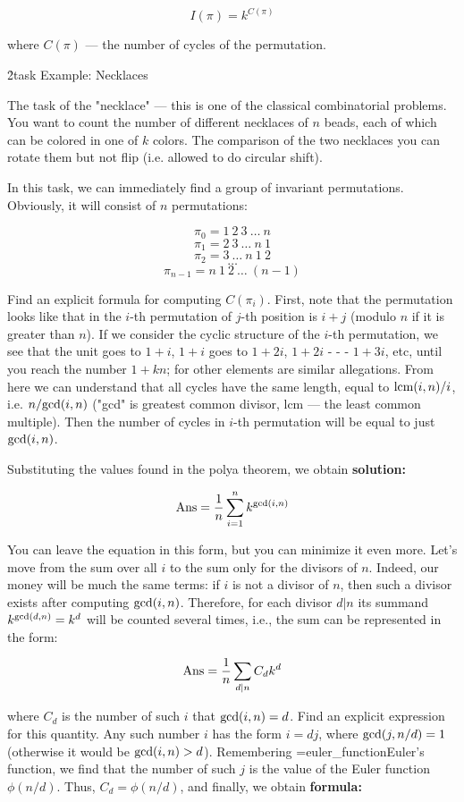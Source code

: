$$ I(\pi) = k ^ {C(\pi)} $$

where $C(\pi)$ --- the number of cycles of the permutation.

\h2{task Example: Necklaces}

The task of the "necklace" --- this is one of the classical combinatorial problems. You want to count the number of different necklaces of $n$ beads, each of which can be colored in one of $k$ colors. The comparison of the two necklaces you can rotate them but not flip (i.e. allowed to do circular shift).

In this task, we can immediately find a group of invariant permutations. Obviously, it will consist of $n$ permutations:

$$ \pi_0 = 1\ 2\ 3\ \ldots\ n $$
$$ \pi_1 = 2\ 3\ \ldots\ n\ 1 $$
$$ \pi_2 = 3\ \ldots\ n\ 1\ 2 $$
$$ \ldots $$
$$ \pi_{n-1} = n\ 1\ 2\ \ldots\ (n-1) $$

Find an explicit formula for computing $C(\pi_i)$. First, note that the permutation looks like that in the $i$-th permutation of $j$-th position is $i+j$ (modulo $n$ if it is greater than $n$). If we consider the cyclic structure of the $i$-th permutation, we see that the unit goes to $1+i$, $1+i$ goes to $1+2i$, $1+2i$ - - - $1+3i$, etc, until you reach the number $1 + kn$; for other elements are similar allegations. From here we can understand that all cycles have the same length, equal to ${\rm lcm}(i,n) / i$, i.e. $n / {\rm gcd}(i,n)$ ("gcd" is greatest common divisor, lcm --- the least common multiple). Then the number of cycles in $i$-th permutation will be equal to just ${\rm gcd}(i,n)$.

Substituting the values found in the polya theorem, we obtain \bf{solution}:

$$ {\rm Ans} = \frac{1}{n} \sum_{i=1}^{n} k ^ {{\rm gcd}(i,n)} $$

You can leave the equation in this form, but you can minimize it even more. Let's move from the sum over all $i$ to the sum only for the divisors of $n$. Indeed, our money will be much the same terms: if $i$ is not a divisor of $n$, then such a divisor exists after computing ${\rm gcd}(i,n)$. Therefore, for each divisor $d|n$ its summand $k^{{\rm gcd}(d,n)} = k^d$ will be counted several times, i.e., the sum can be represented in the form:

$$ {\rm Ans} = \frac{1}{n} \sum_{d|n} C_d k^d $$

where $C_d$ is the number of such $i$ that ${\rm gcd}(i,n) = d$. Find an explicit expression for this quantity. Any such number $i$ has the form $i=dj$, where ${\rm gcd}(j,n/d) = 1$ (otherwise it would be ${\rm gcd}(i,n) > d$). Remembering \algohref=euler_function{Euler's function}, we find that the number of such $j$ is the value of the Euler function $\phi(n/d)$. Thus, $C_d = \phi(n/d)$, and finally, we obtain \bf{formula}:

